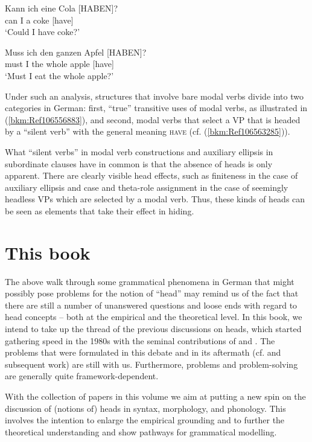 \documentclass[output=paper
  ,nobabel
  ,draftmode
  ,colorlinks, citecolor=brown
]{langscibook}
\begin{document}
\ex
\gll Kann  ich  eine   Cola  [\MakeUppercase{haben}]?\\
       can     I      a       coke   [have]\\
\glt   `Could I have coke?'

\ex
\gll Muss   ich   den    ganzen    Apfel   [\MakeUppercase{haben}]?\\
       must    I      the     whole      apple   [have]\\
\glt   `Must I eat the whole apple?'
\zl


\noindent
Under such an analysis, structures that involve bare modal verbs divide into two categories in
German: first, ``true'' transitive uses of modal verbs, as illustrated in (\ref{bkm:Ref106556883}),
and second, modal verbs that select a VP that is headed by a ``silent verb'' with the general meaning
\textsc{have} (cf. (\ref{bkm:Ref106563285})).

What ``silent verbs'' in modal verb constructions and auxiliary ellipsis in subordinate clauses have
in common is that the absence of heads is only apparent. There are clearly visible head effects,
such as finiteness in the case of auxiliary ellipsis and case and theta-role assignment in the case
of seemingly headless VPs which are selected by a modal verb. Thus, these kinds of heads can be seen
as elements that take their effect in hiding.

\section{This book}

The above walk through some grammatical phenomena in German that might possibly pose problems for
the notion of ``head'' may remind us of the fact that there are still a number of unanswered questions
and loose ends with regard to head concepts – both at the empirical and the theoretical level. In
this book, we intend to take up the thread of the previous discussions on heads, which started
gathering speed in the 1980s with the seminal contributions of \citet{Zwicky85a} and
\citet{Hudson1987}. The problems that were formulated in this debate and in its aftermath
(cf. \citealt{CorbettEtAl1993} and subsequent work) are still with us. Furthermore, problems and
problem-solving are generally quite framework-dependent.

With the collection of papers in this volume we aim at putting a new spin on the discussion of
(notions of) heads in syntax, morphology, and phonology. This involves the intention to enlarge the
empirical grounding and to further the theoretical understanding and show pathways for grammatical
modelling.
\end{document}
